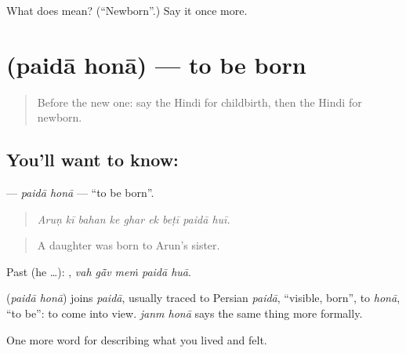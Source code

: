 \begin{tcolorbox}[breakable,colback=teal!4,colframe=teal!35!black,title={Before you move on}]
What does  mean? (\textquotedblleft{}Newborn\textquotedblright{}.) Say it once more.
\end{tcolorbox}
\section[\texorpdfstring{\hi{पैदा} \hi{होना} (paidā honā)}{पैदा होना (paidā honā)}]{  (paidā honā) — to be born}

\label{lesson:HI-C497-paidahona}



\begin{quote}
Before the new one: say the Hindi for childbirth, then the Hindi for newborn.
\end{quote}

\subsection*{You'll want to know:  }
\textbf{ } — \emph{paidā honā} — \textquotedblleft{}to be born\textquotedblright{}.

\begin{quote}
        
\end{quote}

\begin{quote}
\emph{Aruṇ kī bahan ke ghar ek beṭī paidā huī.}
\end{quote}

\begin{quote}
A daughter was born to Arun's sister.
\end{quote}

Past (he …):     , \emph{vah gā̃v meṁ paidā huā}.

\begin{cousinweb}
\textbf{ } (\emph{paidā honā}) joins \emph{paidā}, usually traced to Persian \emph{paidā}, \textquotedblleft{}visible, born\textquotedblright{}, to \emph{honā}, \textquotedblleft{}to be\textquotedblright{}: to come into view. \emph{janm honā} says the same thing more formally.
\end{cousinweb}

\begin{grammarlens}[title={What you've built}]
One more word for describing what you lived and felt.
\end{grammarlens}

